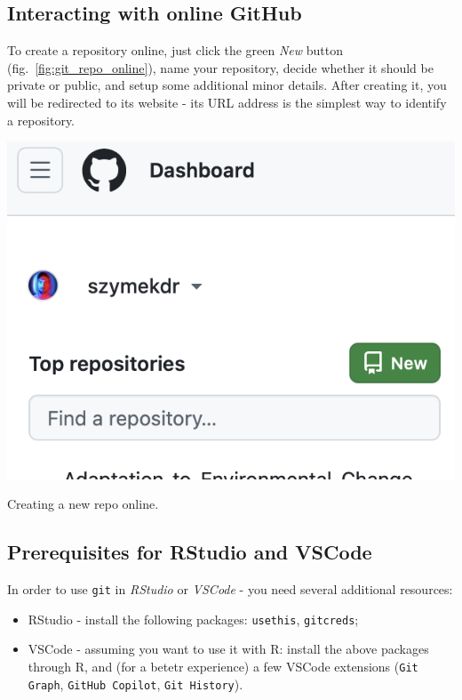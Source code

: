 \documentclass{tufte-handout}
\begin{document}
\subsection{Interacting with online GitHub}

To create a repository online, just click the green \textit{New} button (fig.~\ref{fig:git_repo_online}), name your repository, decide whether it should be private or public, and setup some additional minor details. After creating it, you will be redirected to its website - its URL address is the simplest way to identify a repository.

\begin{marginfigure}
    \includegraphics[width=1\linewidth]{Zrzut ekranu 2024-12-20 o 11.57.42.png}
    \caption{Creating a new repo online.}
  \label{fig:git_repo_online}
\end{marginfigure}

\subsection{Prerequisites for RStudio and VSCode}

In order to use \texttt{git} in \textit{RStudio} or \textit{VSCode} - you need several additional resources:

\begin{itemize}
    \item RStudio - install the following packages: \texttt{usethis}, \texttt{gitcreds};
    \item VSCode - assuming you want to use it with \textsf{R}: install the above packages through \textsf{R}, and (for a betetr experience) a few VSCode extensions (\texttt{Git Graph}, \texttt{GitHub Copilot}, \texttt{Git History}).
\end{itemize}
\end{document}
